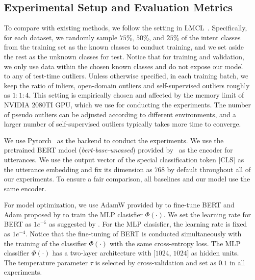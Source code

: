 \subsection{Experimental Setup and Evaluation Metrics}
To compare with existing methods, we follow the setting in LMCL~\citep{DBLP:conf/acl/LinX19}. Specifically, for each dataset, we randomly sample $75\%$, $50\%$, and $25\%$ of the intent classes from the training set as the known classes to conduct training, and we set aside the rest as the unknown classes for test. 
Notice that for training and validation, we only use data within the chosen known classes and do not expose our model to any of test-time outliers. 
Unless otherwise specified, in each training batch, we keep the ratio of inliers, open-domain outliers and self-supervised outliers roughly as $1:1:4$. This setting is empirically chosen and affected by the memory limit of NVIDIA 2080TI GPU, which we use for conducting the experiments. The number of pseudo outliers can be adjusted according to different environments, and a larger number of self-supervised outliers typically takes more time to converge.

We use Pytorch~\citep{DBLP:conf/nips/PaszkeGMLBCKLGA19} as the backend to conduct the experiments. We use the pretrained BERT mdoel (\emph{bert-base-uncased}) provided by~\citet{wolf2019huggingface} as the encoder for utterances. We use the output vector of the special classification token [CLS] as the utterance embedding and fix its dimension as $768$ by default throughout all of our experiments. To ensure a fair comparison, all baselines and our model use the same encoder. 



For model optimization, we use AdamW provided by \citet{wolf2019huggingface} to fine-tune BERT and Adam proposed by \citet{DBLP:journals/corr/KingmaB14} to train the MLP clasisfier $\Phi(\cdot)$. We set the learning rate for BERT as $1e^{-5}$ as suggested by \citet{DBLP:conf/naacl/DevlinCLT19}. For the MLP clasisfier, the learning rate is fixed as $1e^{-4}$. Notice that the fine-tuning of BERT is conducted simultaneously with the training of the classifier $\Phi(\cdot)$ with the same cross-entropy loss. 
The MLP classifier $\Phi(\cdot)$ has a two-layer architecture with [$1024$, $1024$] as hidden units.
The temperature parameter $\tau$ is selected by cross-validation and set as $0.1$ in all experiments.

